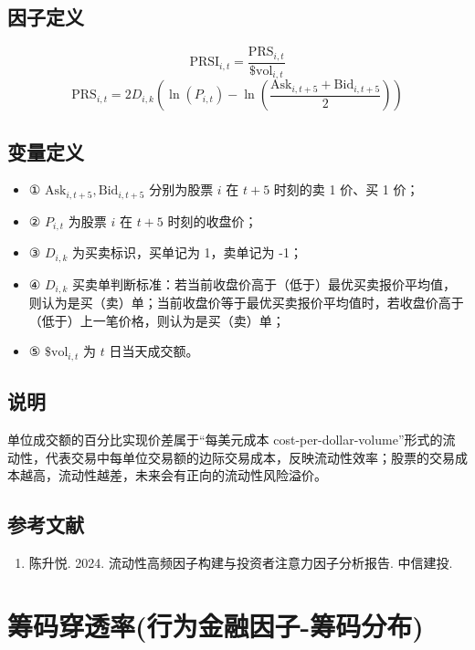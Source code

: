 \documentclass{article}
\begin{document}
\subsection{因子定义}
\begin{equation}
    \mathrm{PRSI}_{i,t} = \frac{\mathrm{PRS}_{i,t}}{\$ \mathrm{vol}_{i,t}}
\end{equation}
\begin{equation}
    \mathrm{PRS}_{i,t} = 2 D_{i,k} \left( \ln(P_{i,t}) - \ln\left(\frac{\mathrm{Ask}_{i,t+5} + \mathrm{Bid}_{i,t+5}}{2}\right) \right)
\end{equation}

\subsection{变量定义}
\begin{itemize}
    \item ① \( \mathrm{Ask}_{i,t+5}, \mathrm{Bid}_{i,t+5} \) 分别为股票 \( i \) 在 \( t+5 \) 时刻的卖 1 价、买 1 价；
    \item ② \( P_{i,t} \) 为股票 \( i \) 在 \( t+5 \) 时刻的收盘价；
    \item ③ \( D_{i,k} \) 为买卖标识，买单记为 1，卖单记为 -1；
    \item ④ \( D_{i,k} \) 买卖单判断标准：若当前收盘价高于（低于）最优买卖报价平均值，则认为是买（卖）单；当前收盘价等于最优买卖报价平均值时，若收盘价高于（低于）上一笔价格，则认为是买（卖）单；
    \item ⑤ \( \$ \mathrm{vol}_{i,t} \) 为 \( t \) 日当天成交额。
\end{itemize}

\subsection{说明}
单位成交额的百分比实现价差属于“每美元成本 cost-per-dollar-volume”形式的流动性，代表交易中每单位交易额的边际交易成本，反映流动性效率；股票的交易成本越高，流动性越差，未来会有正向的流动性风险溢价。

\subsection{参考文献}
\begin{enumerate}
    \item 陈升悦. 2024. 流动性高频因子构建与投资者注意力因子分析报告. 中信建投.
\end{enumerate}

\section{筹码穿透率(行为金融因子-筹码分布)}
\end{document}
